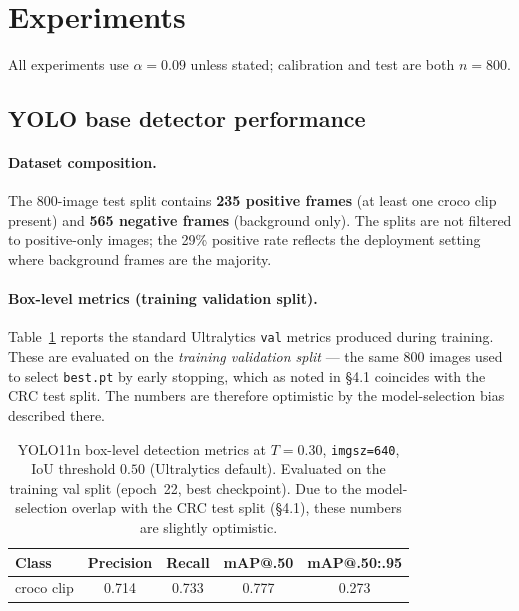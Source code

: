 \documentclass[11pt,a4paper]{article}
\newcommand{\code}[1]{\texttt{\small #1}}
\begin{document}
\section{Experiments}
All experiments use $\alpha = 0.09$ unless stated; calibration and test are both
$n=800$.

\subsection{YOLO base detector performance}
\label{sec:yolo-baseline}

\paragraph{Dataset composition.}
The 800-image test split contains \textbf{235 positive frames} (at least one
croco clip present) and \textbf{565 negative frames} (background only). The
splits are not filtered to positive-only images; the 29\% positive rate
reflects the deployment setting where background frames are the majority.

\paragraph{Box-level metrics (training validation split).}
Table~\ref{tab:yolo-box} reports the standard Ultralytics \code{val} metrics
produced during training. These are evaluated on the \emph{training validation
split} — the same $800$ images used to select \code{best.pt} by early stopping,
which as noted in \S4.1 coincides with the CRC test split. The numbers are
therefore optimistic by the model-selection bias described there.

\begin{table}[h]\centering
\caption{YOLO11n box-level detection metrics at $T{=}0.30$, \code{imgsz=640},
IoU threshold $0.50$ (Ultralytics default). Evaluated on the training val split
(epoch~22, best checkpoint). Due to the model-selection overlap with the CRC test
split (\S4.1), these numbers are slightly optimistic.}
\label{tab:yolo-box}
\begin{tabular}{lcccc}
\toprule
Class & Precision & Recall & mAP@.50 & mAP@.50:.95 \\
\midrule
croco clip & 0.714 & 0.733 & 0.777 & 0.273 \\
\bottomrule
\end{tabular}
\end{table}
\end{document}

